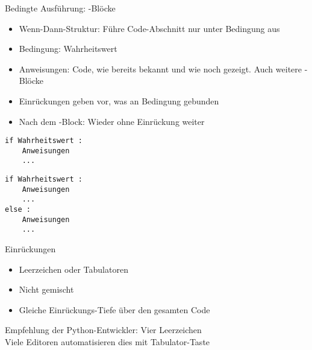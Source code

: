 \begin{frame}[fragile]{Bedingte Ausführung: -Blöcke}
%
\begin{minipage}[t]{.49\linewidth}
\begin{itemize}
\item Wenn-Dann-Struktur: Führe Code-Abschnitt nur unter Bedingung aus
\item Bedingung: Wahrheitswert
\item Anweisungen: Code, wie bereits bekannt und wie noch gezeigt. Auch weitere -Blöcke
\item Einrückungen geben vor, was an Bedingung gebunden
\item Nach dem -Block: Wieder ohne Einrückung weiter
\end{itemize}
\end{minipage}
%
\begin{minipage}[t]{.49\linewidth}
\phantom{x}
\begin{codebox}
\begin{verbatim}
if Wahrheitswert :
    Anweisungen
    ...
\end{verbatim}
\end{codebox}
%
\begin{codebox}
\begin{verbatim}
if Wahrheitswert :
    Anweisungen
    ...
else :
    Anweisungen
    ...
\end{verbatim}
\end{codebox}
\end{minipage}
%
\end{frame}


\begin{frame}{Einrückungen}
%
\begin{itemize}
\item Leerzeichen oder Tabulatoren
\item Nicht gemischt
\item Gleiche Einrückungs-Tiefe über den gesamten Code
\end{itemize}
%
\begin{hintbox}
Empfehlung der Python-Entwickler: Vier Leerzeichen\\
Viele Editoren automatisieren dies mit Tabulator-Taste
\end{hintbox}
%
\end{frame}

